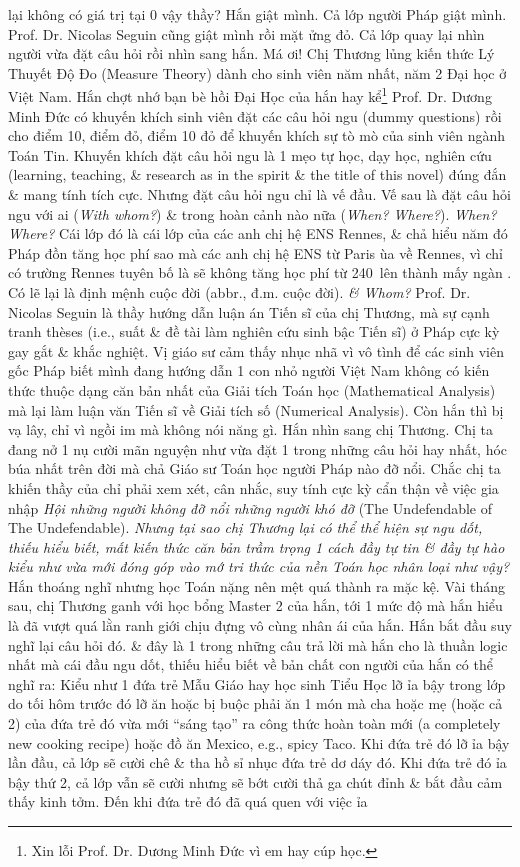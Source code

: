 \documentclass[12pt,oneside]{book}
\begin{document}
lại không có giá trị tại $0$ vậy thầy? Hắn giật mình. Cả lớp người Pháp giật mình. Prof. Dr. {\sc Nicolas Seguin} cũng giật mình rồi mặt ửng đỏ. Cả lớp quay lại nhìn người vừa đặt câu hỏi rồi nhìn sang hắn. Má ơi! Chị Thương lủng kiến thức Lý Thuyết Độ Đo (Measure Theory) dành cho sinh viên năm nhất, năm 2 Đại học ở Việt Nam. Hắn chợt nhớ bạn bè hồi Đại Học của hắn hay kể\footnote{Xin lỗi Prof. Dr. {\sc Dương Minh Đức} vì em hay cúp học.} Prof. Dr. {\sc Dương Minh Đức} có khuyến khích sinh viên đặt các câu hỏi ngu (dummy questions) rồi cho điểm 10, điểm đỏ, điểm 10 đỏ để khuyến khích sự tò mò của sinh viên ngành Toán Tin. Khuyến khích đặt câu hỏi ngu là 1 mẹo tự học, dạy học, nghiên cứu (learning, teaching, \& research as in the spirit \& the title of this novel) đúng đắn \& mang tính tích cực. Nhưng đặt câu hỏi ngu chỉ là vế đầu. Vế sau là đặt câu hỏi ngu với ai ({\it With whom?}) \& trong hoàn cảnh nào nữa ({\it When? Where?}). {\it When? Where?} Cái lớp đó là cái lớp của các anh chị hệ ENS Rennes, \& chả hiểu năm đó Pháp đồn tăng học phí sao mà các anh chị hệ ENS từ Paris ùa về Rennes, vì chỉ có trường Rennes tuyên bố là sẽ không tăng học phí từ 240\texteuro\ lên thành mấy ngàn \texteuro. Có lẽ lại là định mệnh cuộc đời (abbr., đ.m. cuộc đời). {\it\& Whom?} Prof. Dr. {\sc Nicolas Seguin} là thầy hướng dẫn luận án Tiến sĩ của chị Thương, mà sự cạnh tranh th\`eses (i.e., suất \& đề tài làm nghiên cứu sinh bậc Tiến sĩ) ở Pháp cực kỳ gay gắt \& khắc nghiệt. Vị giáo sư cảm thấy nhục nhã vì vô tình để các sinh viên gốc Pháp biết mình đang hướng dẫn 1 con nhỏ người Việt Nam không có kiến thức thuộc dạng căn bản nhất của Giải tích Toán học (Mathematical Analysis) mà lại làm luận văn Tiến sĩ về Giải tích số (Numerical Analysis). Còn hắn thì bị vạ lây, chỉ vì ngồi im mà không nói năng gì. Hắn nhìn sang chị Thương. Chị ta đang nở 1 nụ cười mãn nguyện như vừa đặt 1 trong những câu hỏi hay nhất, hóc búa nhất trên đời mà chả Giáo sư Toán học người Pháp nào đỡ nổi. Chắc chị ta khiến thầy của chỉ phải xem xét, cân nhắc, suy tính cực kỳ cẩn thận về việc gia nhập {\it Hội những người không đỡ nổi những người khó đỡ} (The Undefendable of The Undefendable). {\it Nhưng tại sao chị Thương lại có thể thể hiện sự ngu dốt, thiếu hiểu biết, mất kiến thức căn bản trầm trọng 1 cách đầy tự tin \& đầy tự hào kiểu như vừa mới đóng góp vào mớ tri thức của nền Toán học nhân loại như vậy?} Hắn thoáng nghĩ nhưng học Toán nặng nên mệt quá thành ra mặc kệ. Vài tháng sau, chị Thương ganh với học bổng Master 2 của hắn, tới 1 mức độ mà hắn hiểu là đã vượt quá lằn ranh giới chịu đựng vô cùng nhân ái của hắn. Hắn bắt đầu suy nghĩ lại câu hỏi đó. \& đây là 1 trong những câu trả lời mà hắn cho là thuần logic nhất mà cái đầu ngu dốt, thiếu hiểu biết về bản chất con người của hắn có thể nghĩ ra: Kiểu như 1 đứa trẻ Mẫu Giáo hay học sinh Tiểu Học lỡ ỉa bậy trong lớp do tối hôm trước đó lỡ ăn hoặc bị buộc phải ăn 1 món mà cha hoặc mẹ (hoặc cả 2) của đứa trẻ đó vừa mới ``sáng tạo'' ra công thức hoàn toàn mới (a completely new cooking recipe) hoặc đồ ăn Mexico, e.g., spicy Taco. Khi đứa trẻ đó lỡ ỉa bậy lần đầu, cả lớp sẽ cười chê \& tha hồ sỉ nhục đứa trẻ dơ dáy đó. Khi đứa trẻ đó ỉa bậy thứ 2, cả lớp vẫn sẽ cười nhưng sẽ bớt cười thả ga chút đỉnh \& bắt đầu cảm thấy kinh tởm. Đến khi đứa trẻ đó đã quá quen với việc ỉa 
\end{document}
